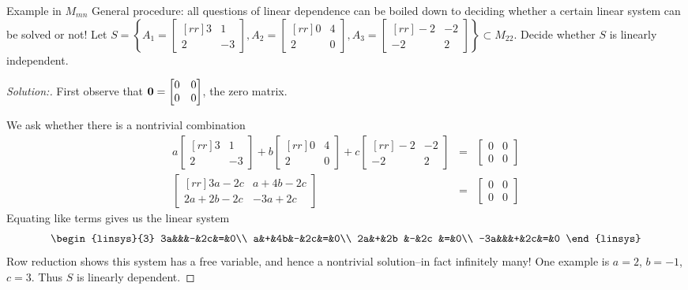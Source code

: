 \begin{frame}{Example in $M_{mn}$}
\alert{General procedure:} all questions of linear dependence can be boiled down to deciding whether a certain linear system can be solved or not!
\bspace
Let $S=\left\{
A_1=\begin{bmatrix}[rr] 
3&1\\
2&-3
\end{bmatrix},
A_2= \begin{bmatrix}[rr]
0&4\\
2&0
\end{bmatrix}, 
A_3=\begin{bmatrix}[rr]
-2&-2\\
-2&2
\end{bmatrix}
\right\}\subset M_{22}$. Decide whether $S$ is linearly independent. 
\pause
\begin{proof}[Solution:] 
\scriptsize
First observe that ${\mathbf 0}=\begin{bmatrix}
0&0\\0&0
\end{bmatrix}$, the zero matrix. 

We ask whether there is a \alert{nontrivial} combination
\begin{eqnarray*}
a\begin{bmatrix} [rr]
3&1\\
2&-3
\end{bmatrix}+b\begin{bmatrix}[rr]
0&4\\
2&0
\end{bmatrix}+c\begin{bmatrix}[rr]
-2&-2\\
-2&2
\end{bmatrix}&=&\begin{bmatrix}
0&0\\0&0
\end{bmatrix}\\
\begin{bmatrix}[rr]
3a-2c&a+4b-2c\\
2a+2b-2c&-3a+2c
\end{bmatrix} &=&\begin{bmatrix}
0&0\\0&0
\end{bmatrix}
\end{eqnarray*}
\pause Equating like terms gives us the linear system
\[
\begin{linsys}{3}
3a&&&-&2c&=&0\\
a&+&4b&-&2c&=&0\\
2a&+&2b &-&2c &=&0\\
-3a&&&+&2c&=&0
\end{linsys}
\]
\pause Row reduction shows this system has a free variable, and hence a nontrivial solution--in fact infinitely many! One example is $a=2$, $b=-1$, $c=3$.  Thus $S$ is \alert{linearly dependent}.
\end{proof}
\end{frame}
